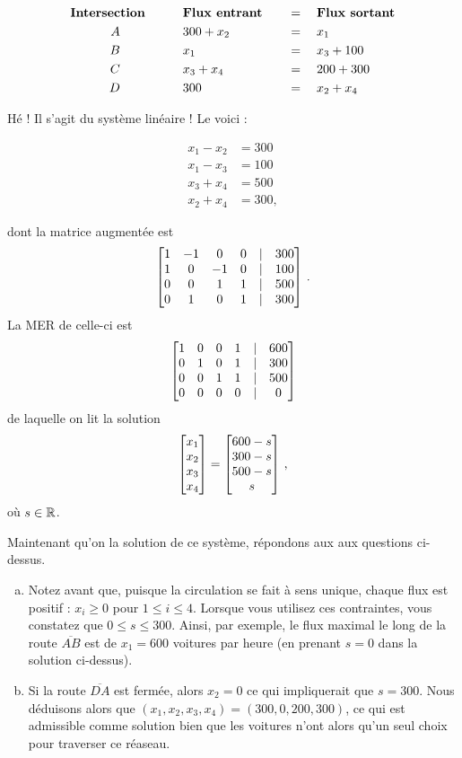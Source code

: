 \begin{myprob}
\begin{mysol}
\begin{alignat*}{3}
\text{\bf Intersection}\quad &&&\quad \text{\bf Flux entrant}\quad&&=\quad\text{\bf Flux sortant}\\
A\qquad \quad&&&\quad300+x_2 &&=\quad x_1\\
B\qquad \quad &&&\quad x_1 &&=\quad x_3+100\\
C\qquad \quad &&&\quad x_3+x_4 &&=\quad 200 + 300\\
D\qquad \quad &&&\quad300 &&=\quad x_2+x_4
\end{alignat*}



Hé ! Il s'agit du système linéaire ! Le voici :

\begin{align*}
x_1-x_2 &= 300\\
x_1-x_3 &= 100\\
x_3+x_4 &= 500\\
x_2+x_4 &= 300,
\end{align*}

dont la  matrice augment\'ee est
$$
\left[ \begin{matrix} 
1 & -1 & 0 & 0 & |& 300\\
1 & 0 & -1 & 0 & |& 100\\
0 & 0 & 1 & 1  &|& 500\\
0 & 1 & 0 & 1  &|& 300 \end{matrix} \right]\,. 
$$ 
La MER de celle-ci est
$$
\left[ \begin{matrix} 
1 & 0 & 0 & 1 & |& 600\\
0 & 1 & 0 & 1 & |& 300\\
0 & 0 & 1 & 1  &|& 500\\
0 & 0 & 0 & 0  &|& 0 \end{matrix} \right]
$$
de laquelle on lit la solution 
$$
\left[ \begin{matrix} x_1\\x_2\\x_3\\x_4 \end{matrix} \right] = \left[ \begin{matrix} 600-s\\300-s\\500-s\\s \end{matrix} \right]\,,
$$
o\`u $s\in \mathbb{R}$.


Maintenant qu'on la solution de ce syst\`eme, r\'epondons aux aux questions ci-dessus.
\begin{enumerate}[(a)] 
\item Notez avant que, puisque la circulation se fait à sens unique, chaque flux est positif : $x_i\ge 0$ pour $1\le i\le 4$. Lorsque vous utilisez ces contraintes, vous constatez que $0\le s\le 300$. Ainsi, par exemple, le flux maximal le long de la route $\overline{AB}$ est de $x_1=600$ voitures par heure (en prenant $s=0$ dans la solution ci-dessus).

\item Si la route $\overline{DA}$ est fermée, alors $x_2=0$ ce qui impliquerait que $s=300$. Nous déduisons alors que  
$(x_1,x_2,x_3,x_4) = (300,0,200,300)$, ce qui est admissible comme solution bien que les voitures n'ont alors qu'un seul choix pour traverser ce r\'easeau.


\end{enumerate}
\end{mysol}
\end{myprob}
